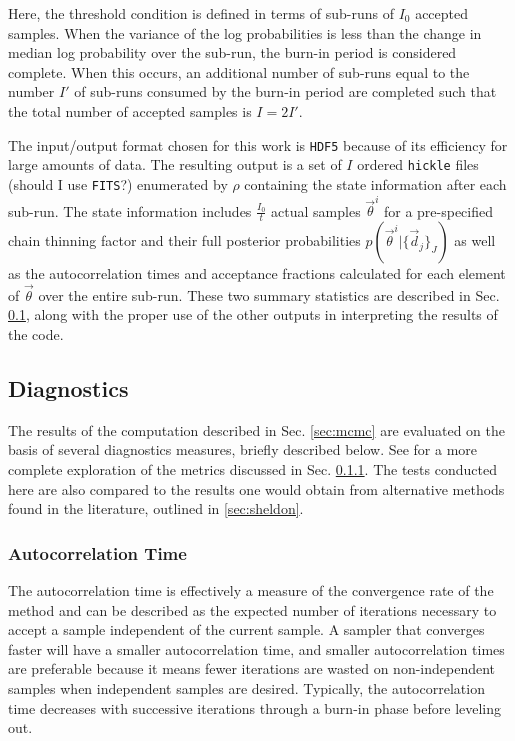 \documentclass[preprint]{aastex}
\begin{document}
Here, the threshold condition is defined in terms of sub-runs of $I_{0}$ 
accepted samples.  When the variance of the log probabilities is less than the 
change in median log probability over the sub-run, the burn-in period is 
considered complete.  When this occurs, an additional number of sub-runs equal 
to the number $I'$ of sub-runs consumed by the burn-in period are completed 
such that the total number of accepted samples is $I=2I'$.  

The input/output format chosen for this work is \texttt{HDF5} because of its 
efficiency for large amounts of data.  The resulting output is a set of $I$ 
ordered \texttt{hickle} files (should I use \texttt{FITS}?) enumerated by 
$\rho$ containing the state information after each sub-run.  The state 
information includes $\frac{I_{0}}{t}$ actual samples $\vec{\theta}^{i}$ for a 
pre-specified chain thinning factor and their full posterior probabilities 
$p(\vec{\theta}^{i}|\{\vec{d}_{j}\}_{J})$ as well as the autocorrelation times 
and acceptance fractions calculated for each element of $\vec{\theta}$ over the 
entire sub-run.  These two summary statistics are described in Sec. 
\ref{sec:diag}, along with the proper use of the other outputs in interpreting 
the results of the code.

\clearpage
\subsection{Diagnostics}
\label{sec:diag}

The results of the computation described in Sec. \ref{sec:mcmc} are evaluated 
on the basis of several diagnostics measures, briefly described below.  See 
\citet{for12} for a more complete exploration of the metrics discussed in Sec. 
\ref{sec:acorr}.  The tests conducted here are also compared to the results one 
would obtain from alternative methods found in the literature, outlined in 
\ref{sec:sheldon}.

\clearpage
\subsubsection{Autocorrelation Time}
\label{sec:acorr}

The autocorrelation time is effectively a measure of the convergence rate of 
the method and can be described as the expected number of iterations necessary 
to accept a sample independent of the current sample.  A sampler that converges 
faster will have a smaller autocorrelation time, and smaller autocorrelation 
times are preferable because it means fewer iterations are wasted on 
non-independent samples when independent samples are desired.  Typically, the 
autocorrelation time decreases with successive iterations through a burn-in 
phase before leveling out.
\end{document}
